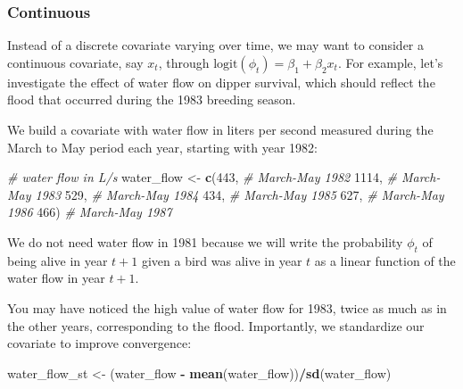 \documentclass[
  12pt,
]{krantz}
\newenvironment{Shaded}{\begin{snugshade}}{\end{snugshade}}
\newcommand{\CommentTok}[1]{\textcolor[rgb]{0.56,0.35,0.01}{\textit{#1}}}
\newcommand{\DecValTok}[1]{\textcolor[rgb]{0.00,0.00,0.81}{#1}}
\newcommand{\FunctionTok}[1]{\textcolor[rgb]{0.13,0.29,0.53}{\textbf{#1}}}
\newcommand{\NormalTok}[1]{#1}
\newcommand{\OtherTok}[1]{\textcolor[rgb]{0.56,0.35,0.01}{#1}}
\newcommand{\SpecialCharTok}[1]{\textcolor[rgb]{0.81,0.36,0.00}{\textbf{#1}}}
\begin{document}
\hypertarget{continuous}{%
\subsubsection{Continuous}\label{continuous}}

Instead of a discrete covariate varying over time, we may want to consider a continuous covariate, say \(x_t\), through \(\text{logit}(\phi_t) = \beta_1 + \beta_2 x_t\). For example, let's investigate the effect of water flow on dipper survival, which should reflect the flood that occurred during the 1983 breeding season.

We build a covariate with water flow in liters per second measured during the March to May period each year, starting with year 1982:

\begin{Shaded}
\begin{Highlighting}[]
\CommentTok{\# water flow in L/s}
\NormalTok{water\_flow }\OtherTok{\textless{}{-}} \FunctionTok{c}\NormalTok{(}\DecValTok{443}\NormalTok{,  }\CommentTok{\# March{-}May 1982}
                \DecValTok{1114}\NormalTok{, }\CommentTok{\# March{-}May 1983}
                \DecValTok{529}\NormalTok{,  }\CommentTok{\# March{-}May 1984}
                \DecValTok{434}\NormalTok{,  }\CommentTok{\# March{-}May 1985}
                \DecValTok{627}\NormalTok{,  }\CommentTok{\# March{-}May 1986}
                \DecValTok{466}\NormalTok{)  }\CommentTok{\# March{-}May 1987}
\end{Highlighting}
\end{Shaded}

We do not need water flow in 1981 because we will write the probability \(\phi_t\) of being alive in year \(t + 1\) given a bird was alive in year \(t\) as a linear function of the water flow in year \(t + 1\).

You may have noticed the high value of water flow for 1983, twice as much as in the other years, corresponding to the flood. Importantly, we standardize our covariate to improve convergence:

\begin{Shaded}
\begin{Highlighting}[]
\NormalTok{water\_flow\_st }\OtherTok{\textless{}{-}}\NormalTok{ (water\_flow }\SpecialCharTok{{-}} \FunctionTok{mean}\NormalTok{(water\_flow))}\SpecialCharTok{/}\FunctionTok{sd}\NormalTok{(water\_flow)}
\end{Highlighting}
\end{Shaded}
\end{document}
